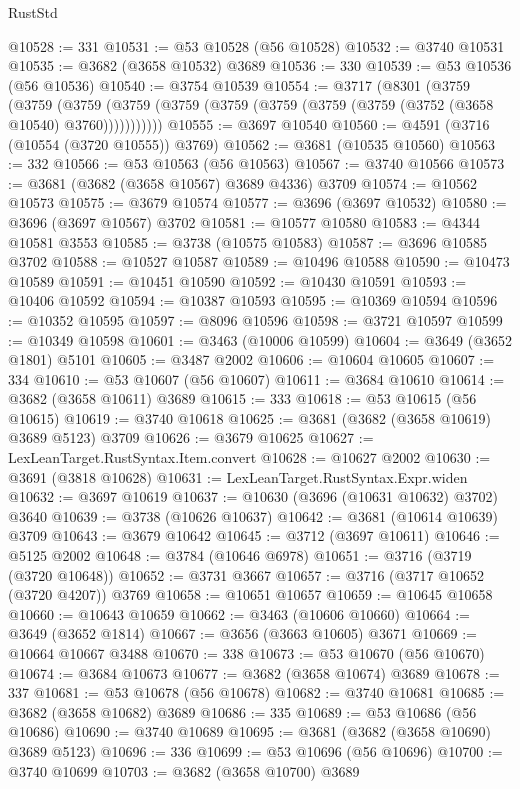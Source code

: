 \begin{lexlean}{RustStd}
\begin{coremodule}
@10528 := 331
@10531 := @53 @10528 (@56 @10528)
@10532 := @3740 @10531
@10535 := @3682 (@3658 @10532) @3689
@10536 := 330
@10539 := @53 @10536 (@56 @10536)
@10540 := @3754 @10539
@10554 := @3717
    (@8301
      (@3759
        (@3759
          (@3759 (@3759 (@3759 (@3759 (@3759 (@3759 (@3759 (@3752 (@3658 @10540) @3760)))))))))))
@10555 := @3697 @10540
@10560 := @4591 (@3716 (@10554 (@3720 @10555)) @3769)
@10562 := @3681 (@10535 @10560)
@10563 := 332
@10566 := @53 @10563 (@56 @10563)
@10567 := @3740 @10566
@10573 := @3681 (@3682 (@3658 @10567) @3689 @4336) @3709
@10574 := @10562 @10573
@10575 := @3679 @10574
@10577 := @3696 (@3697 @10532)
@10580 := @3696 (@3697 @10567) @3702
@10581 := @10577 @10580
@10583 := @4344 @10581 @3553
@10585 := @3738 (@10575 @10583)
@10587 := @3696 @10585 @3702
@10588 := @10527 @10587
@10589 := @10496 @10588
@10590 := @10473 @10589
@10591 := @10451 @10590
@10592 := @10430 @10591
@10593 := @10406 @10592
@10594 := @10387 @10593
@10595 := @10369 @10594
@10596 := @10352 @10595
@10597 := @8096 @10596
@10598 := @3721 @10597
@10599 := @10349 @10598
@10601 := @3463 (@10006 @10599)
@10604 := @3649 (@3652 @1801) @5101
@10605 := @3487 @2002
@10606 := @10604 @10605
@10607 := 334
@10610 := @53 @10607 (@56 @10607)
@10611 := @3684 @10610
@10614 := @3682 (@3658 @10611) @3689
@10615 := 333
@10618 := @53 @10615 (@56 @10615)
@10619 := @3740 @10618
@10625 := @3681 (@3682 (@3658 @10619) @3689 @5123) @3709
@10626 := @3679 @10625
@10627 := LexLeanTarget.RustSyntax.Item.convert
@10628 := @10627 @2002
@10630 := @3691 (@3818 @10628)
@10631 := LexLeanTarget.RustSyntax.Expr.widen
@10632 := @3697 @10619
@10637 := @10630 (@3696 (@10631 @10632) @3702) @3640
@10639 := @3738 (@10626 @10637)
@10642 := @3681 (@10614 @10639) @3709
@10643 := @3679 @10642
@10645 := @3712 (@3697 @10611)
@10646 := @5125 @2002
@10648 := @3784 (@10646 @6978)
@10651 := @3716 (@3719 (@3720 @10648))
@10652 := @3731 @3667
@10657 := @3716 (@3717 @10652 (@3720 @4207)) @3769
@10658 := @10651 @10657
@10659 := @10645 @10658
@10660 := @10643 @10659
@10662 := @3463 (@10606 @10660)
@10664 := @3649 (@3652 @1814)
@10667 := @3656 (@3663 @10605) @3671
@10669 := @10664 @10667 @3488
@10670 := 338
@10673 := @53 @10670 (@56 @10670)
@10674 := @3684 @10673
@10677 := @3682 (@3658 @10674) @3689
@10678 := 337
@10681 := @53 @10678 (@56 @10678)
@10682 := @3740 @10681
@10685 := @3682 (@3658 @10682) @3689
@10686 := 335
@10689 := @53 @10686 (@56 @10686)
@10690 := @3740 @10689
@10695 := @3681 (@3682 (@3658 @10690) @3689 @5123)
@10696 := 336
@10699 := @53 @10696 (@56 @10696)
@10700 := @3740 @10699
@10703 := @3682 (@3658 @10700) @3689

\end{coremodule}
\end{lexlean}
